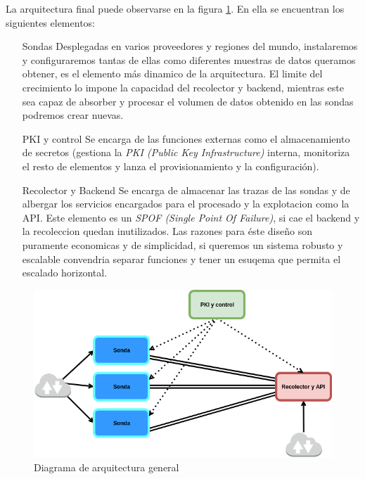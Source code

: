 La arquitectura final puede observarse en la figura \ref{fig:arquitectura-general}. En ella se encuentran los siguientes elementos:

\begin{enumerate}
    \item[Sondas] Desplegadas en varios proveedores y regiones del mundo, instalaremos y configuraremos tantas de ellas como
    diferentes muestras de datos queramos obtener, es el elemento más dinamico de la arquitectura. El limite del crecimiento lo impone la capacidad
    del recolector y backend, mientras este sea capaz de absorber y procesar el volumen de datos obtenido en las sondas podremos crear nuevas.
    \item[PKI y control] Se encarga de las funciones externas como el almacenamiento de secretos (gestiona la \emph{PKI (Public Key Infrastructure)} interna, monitoriza el resto de elementos y lanza el provisionamiento y la configuración).
    \item[Recolector y Backend] Se encarga de almacenar las trazas de las sondas y de albergar los servicios encargados para el procesado y la explotacion como la API. Este elemento es un \emph{SPOF (Single Point Of Failure)}, si cae el backend y la recoleccion quedan inutilizados.
    Las razones para éste diseño son puramente economicas y de simplicidad, si queremos un sistema robusto y escalable convendria separar funciones y tener un esuqema que permita el escalado horizontal.
\end{enumerate}

\begin{figure}[h]
    \centering
      \includegraphics[scale=0.5]{images/arquitectura_general}
    \caption{Diagrama de arquitectura general}
    \label{fig:arquitectura-general}
  \end{figure}

